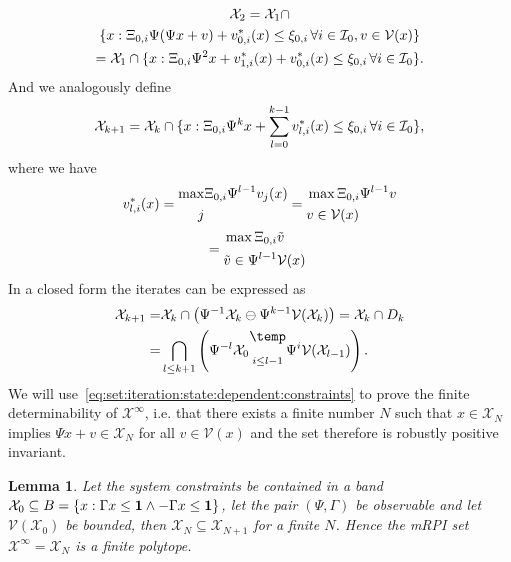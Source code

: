 \documentclass[letterpaper, 10pt, conference]{ieeeconf/ieeeconf} %
\newtheorem{thm}{Lemma}[section]
\newcommand{\bigominus}{\raisebox{10pt}{$\temp$}}
\begin{document}
\begin{multline}
	\mathcal X_2 = \mathcal X_1 \cap \\ \{x:\Xi_{0,i}\Psi(\Psi x + v) + v_{0,i}^\ast(x)\leq\xi_{0,i}\,
	\forall i\in\mathcal I_0,v\in\mathcal V(x)\}\\
	= \mathcal X_1 \cap \{x: \Xi_{0,i}\Psi^2 x + v_{1,i}^\ast(x) + v_{0,i}^\ast(x)\leq\xi_{0,i}\,\forall 
	i\in\mathcal I_0\}.
\end{multline}
And we analogously define
\begin{equation}
	\mathcal X_{k+1} = \mathcal X_k\cap \{x:\Xi_{0,i}\Psi^k x + \sum_{l=0}^{k-1}v_{l,i}^\ast(x)
	\leq\xi_{0,i}\,\forall i\in\mathcal I_0\},
\end{equation}
where we have 
\begin{multline}
	v_{l,i}^\ast(x)=\begin{split}\max& \genmat_{0,i}\Psi^{l-1}v_j(x)\\ j&\end{split}
	 = \begin{split}&\max \genmat_{0,i}\Psi^{l-1}v \\ &v\in\mathcal V(x)\end{split}\\
	= \begin{split}&\max \genmat_{0,i}\tilde v\\ &\tilde v\in \Psi^{l-1}\mathcal V(x) \end{split}
\end{multline}
In a closed form the iterates can be expressed as
\begin{equation}\label{eq:set:iteration:state:dependent:constraints}
\begin{split}
	\mathcal X_{k+1} =& \mathcal X_k\cap\left(\Psi^{-1}\mathcal X_k \ominus \Psi^{k-1}\mathcal V(\mathcal X_k)\right)
	=\mathcal X_k\cap D_k \\
	=& \bigcap_{l\leq k+1}\left( \Psi^{-l} \mathcal X_0 \underset{i\leq l-1}{\bigominus} \Psi^i \mathcal V(\mathcal X_{l-1})\right).
\end{split}\end{equation}
We will use~\eqref{eq:set:iteration:state:dependent:constraints} to prove the finite determinability of
$\mathcal X^\infty$, i.e. that there exists a finite number $N$ such that $x\in\mathcal X_N$ implies
$\Psi x + v \in\mathcal X_N$ for all $v\in\mathcal V(x)$ and the set therefore is robustly positive invariant.
\begin{thm}
Let the system constraints be contained in a band $\mathcal X_0\subseteq B=\{x:\Gamma x\leq{\bf{1}}\wedge 
-\Gamma x\leq{\bf{1}}\}$, let the pair $(\Psi,\Gamma)$ be observable and let $\mathcal V(\mathcal X_0)$ be bounded, 
then $\mathcal X_N\subseteq \mathcal X_{N+1}$ for a finite $N$. Hence the mRPI set $\mathcal X^\infty 
=\mathcal X_N$ is a finite polytope.
\end{thm}
\end{document}
